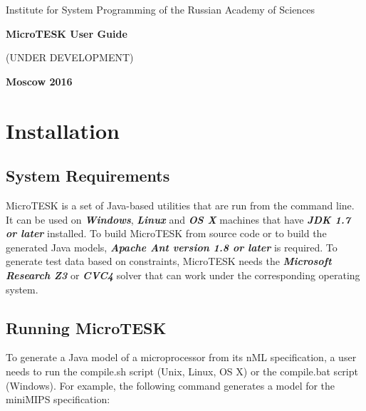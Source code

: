 \documentclass[oneside,final,14pt]{extreport}
\begin{document}
\begin{titlepage}
\begin{center}
\Large{Institute for System Programming of the Russian Academy of Sciences}

\vfill


\bf\Large{MicroTESK User Guide}

(UNDER DEVELOPMENT)

\vfill

\bf
Moscow 2016
\end{center}
\end{titlepage}


\newpage
{} %
\tableofcontents


\chapter{Installation}

\section{System Requirements}

MicroTESK is a set of Java-based utilities that are run from the command line.
It can be used on \textbf{\textit{Windows}}, \textbf{\textit{Linux}} and
\textbf{\textit{OS X}} machines that have \textbf{\textit{JDK 1.7 or later}}
installed. To build MicroTESK from source code or to build the generated
Java models, \textbf{\textit{Apache Ant version 1.8 or later}} is required.
To generate test data based on constraints, MicroTESK needs
the \textbf{\textit{Microsoft Research Z3}} or \textbf{\textit{CVC4}} solver that
can work under the corresponding operating system.

\section{Running MicroTESK}

To generate a Java model of a microprocessor from its nML specification, a user
needs to run the compile.sh script (Unix, Linux, OS X) or the compile.bat script
(Windows). For example, the following command generates a model for the miniMIPS
specification:
\end{document}

